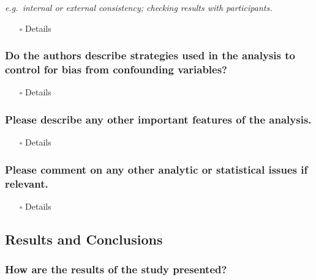 \documentclass[
  doc, a4paper]{apa7}
\providecommand{\tightlist}{%
  \setlength{\itemsep}{0pt}\setlength{\parskip}{0pt}}
\begin{document}
\emph{e.g.~internal or external consistency; checking results with participants.}

\begin{itemize}
\tightlist
\item[$\square$]
  Details
\end{itemize}

\subsubsection{Do the authors describe strategies used in the analysis to control for bias from confounding variables?}\label{do-the-authors-describe-strategies-used-in-the-analysis-to-control-for-bias-from-confounding-variables}

\begin{itemize}
\tightlist
\item[$\square$]
  Details
\end{itemize}

\subsubsection{Please describe any other important features of the analysis.}\label{please-describe-any-other-important-features-of-the-analysis.}

\begin{itemize}
\tightlist
\item[$\square$]
  Details
\end{itemize}

\subsubsection{Please comment on any other analytic or statistical issues if relevant.}\label{please-comment-on-any-other-analytic-or-statistical-issues-if-relevant.}

\begin{itemize}
\tightlist
\item[$\square$]
  Details
\end{itemize}

\subsection{Results and Conclusions}\label{results-and-conclusions}

\subsubsection{How are the results of the study presented?}\label{how-are-the-results-of-the-study-presented}
\end{document}

